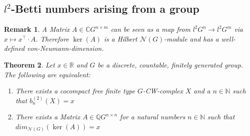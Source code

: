 \documentclass[12pt,a4paper]{scrartcl}
\newtheorem{Theorem}{Theorem}[section]
\newtheorem{Remark}[Theorem]{Remark}
\numberwithin{equation}{section}
\newcommand{\C}{\mathbb{C}} %
\newcommand{\R}{\mathbb{R}} %
\newcommand{\Q}{\mathbb{Q}} %
\newcommand{\N}{\mathbb{N}} %
\newcommand{\2}{\mathbb{Z} / 2 \mathbb{Z}}
\newcommand{\1}{\bar{1}}
\newcommand{\0}{\bar{0}}
\begin{document}
\subsection{$l^2$-Betti numbers arising from a group}
\begin{Remark}\label{MAB}
	A Matrix $A \in \C G^{n \times m}$ can be seen as a map from $l^2G^n \to l^2G^m$ via $x \mapsto x^{\top} \cdot A$. Therefore $\ker(A)$ is a Hilbert $\mathcal{N}(G)$-module and has a well-defined von-Neumann-dimension. 
\end{Remark}
\begin{Theorem} \label{MCW}
	Let $x \in \R$ and $G$ be a discrete, countable, finitely generated group. The following are equivalent:
	\begin{enumerate}
		\item There exists a cocompact free finite type $G$-CW-complex $X$ and a $n \in \N$ such that $b_n^{(2)}(X)=x$
		\item There exists a Matrix $A \in \Q G^{n \times n}$ for a natural numbers $n \in \N$ such that \newline $dim_{\mathcal{N}(G)}(\ker (A))=x$
	\end{enumerate}
\end{Theorem}
\end{document}

